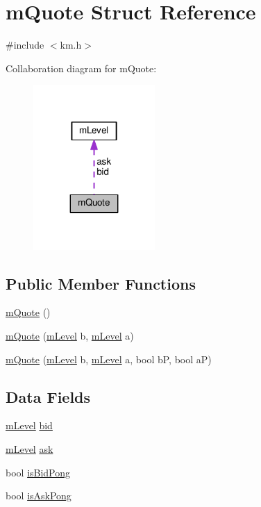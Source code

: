\hypertarget{struct_k_1_1m_quote}{}\section{m\+Quote Struct Reference}
\label{struct_k_1_1m_quote}


{\ttfamily \#include $<$km.\+h$>$}



Collaboration diagram for m\+Quote\+:
\nopagebreak
\begin{figure}[H]
\begin{center}
\leavevmode
\includegraphics[width=131pt]{struct_k_1_1m_quote__coll__graph}
\end{center}
\end{figure}
\subsection*{Public Member Functions}
\begin{DoxyCompactItemize}
\item 
\hyperlink{struct_k_1_1m_quote_a9d118778e26548c90a1e32280f441f02}{m\+Quote} ()
\item 
\hyperlink{struct_k_1_1m_quote_a32665ec650d6239aeabab46521c8a685}{m\+Quote} (\hyperlink{struct_k_1_1m_level}{m\+Level} b, \hyperlink{struct_k_1_1m_level}{m\+Level} a)
\item 
\hyperlink{struct_k_1_1m_quote_a1ed89b99b3d288cd555223074aca21bd}{m\+Quote} (\hyperlink{struct_k_1_1m_level}{m\+Level} b, \hyperlink{struct_k_1_1m_level}{m\+Level} a, bool bP, bool aP)
\end{DoxyCompactItemize}
\subsection*{Data Fields}
\begin{DoxyCompactItemize}
\item 
\hyperlink{struct_k_1_1m_level}{m\+Level} \hyperlink{struct_k_1_1m_quote_a200a5195c910b871fbfdfd76fcedf05a}{bid}
\item 
\hyperlink{struct_k_1_1m_level}{m\+Level} \hyperlink{struct_k_1_1m_quote_af96a7ede4a006c28cef171f07263e102}{ask}
\item 
bool \hyperlink{struct_k_1_1m_quote_a1c64472cd941ada8dbb3d43fce0c133f}{is\+Bid\+Pong}
\item 
bool \hyperlink{struct_k_1_1m_quote_af8d3a1e2055b25f8560bf9869ce14fe4}{is\+Ask\+Pong}
\end{DoxyCompactItemize}


